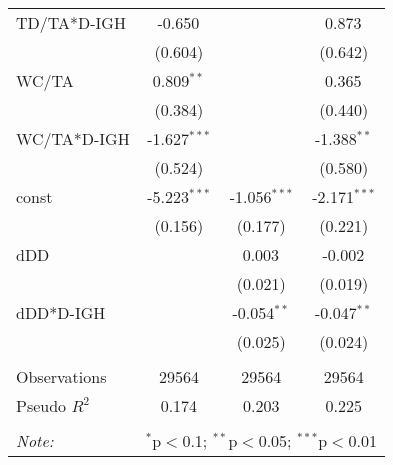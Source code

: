 \begin{table}[!htbp]
\begin{tabular}{@{\extracolsep{5pt}}lccc}
 TD/TA*D-IGH & -0.650$^{}$ & & 0.873$^{}$ \\
& (0.604) & & (0.642) \\
 WC/TA & 0.809$^{**}$ & & 0.365$^{}$ \\
& (0.384) & & (0.440) \\
 WC/TA*D-IGH & -1.627$^{***}$ & & -1.388$^{**}$ \\
& (0.524) & & (0.580) \\
 const & -5.223$^{***}$ & -1.056$^{***}$ & -2.171$^{***}$ \\
& (0.156) & (0.177) & (0.221) \\
 dDD & & 0.003$^{}$ & -0.002$^{}$ \\
& & (0.021) & (0.019) \\
 dDD*D-IGH & & -0.054$^{**}$ & -0.047$^{**}$ \\
& & (0.025) & (0.024) \\
\hline \\[-1.8ex]
 Observations & 29564 & 29564 & 29564 \\
 Pseudo $R^2$ & 0.174 & 0.203 & 0.225 \\
\hline
\hline \\[-1.8ex]
\textit{Note:} & \multicolumn{3}{r}{$^{*}$p$<$0.1; $^{**}$p$<$0.05; $^{***}$p$<$0.01} \\
\end{tabular}
\end{table}